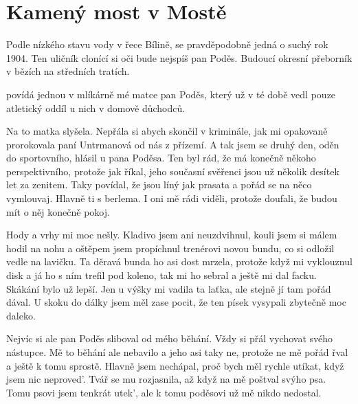 
\chapter{Kamený most v Mostě}

Podle nízkého stavu vody v řece Bílině, se
pravděpodobně jedná o suchý rok 1904. Ten uličník clonící si oči bude
nejspíš pan Poděs. Budoucí okresní přeborník v bězích na středních
tratích.

 povídá
jednou v mlíkárně mé matce pan Poděs, který už v té době vedl pouze
atletický oddíl u nich v domově důchodců.


Na to matka slyšela. Nepřála si abych skončil v kriminále, jak mi opakovaně
prorokovala paní Untrmanová od nás z přízemí. A tak jsem se druhý den, oděn do
sportovního, hlásil u pana Poděsa. Ten byl rád, že má konečně někoho
perspektivního, protože jak říkal, jeho současní svěřenci jsou už několik
desítek let za zenitem. Taky povídal, že jsou líný jak prasata a pořád se na
něco vymlouvaj. Hlavně ti s berlema. I oni mě rádi viděli, protože doufali, že
budou mít o něj konečně pokoj.

Hody a vrhy mi moc nešly. Kladivo jsem ani neuzdvihnul, kouli jsem si málem
hodil na nohu a oštěpem jsem propíchnul trenérovi novou bundu, co si odložil
vedle na lavičku. Ta děravá bunda ho asi dost mrzela, protože když mi
vyklouznul disk a já ho s ním trefil pod koleno, tak mi ho sebral a ještě mi
dal facku. Skákání bylo už lepší. Jen u výšky mi vadila ta laťka, ale stejně jí
tam pořád dával. U skoku do dálky jsem měl zase pocit, že ten písek vysypali
zbytečně moc daleko.

Nejvíc si ale pan Poděs sliboval od mého běhání. Vždy si přál vychovat svého
nástupce. Mě to běhání ale nebavilo a jeho asi taky ne, protože ne mě pořád
řval a ještě k tomu sprostě. Hlavně jsem nechápal, proč bych měl rychle utíkat,
když jsem nic neproved'. Tvář se mu rozjasnila, až když na mě poštval svýho psa.
Tomu psovi jsem tenkrát utek', ale k tomu poděsovi už mě nikdo nedostal.

